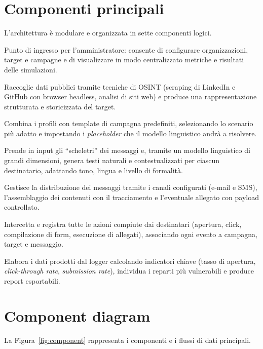 \documentclass[12pt,a4paper,oneside]{report}
\begin{document}
\section{Componenti principali}
L'architettura \`e modulare e organizzata in sette componenti logici.

\begin{description}[style=nextline,leftmargin=0pt]
  \item[Dashboard] Punto di ingresso per l'amministratore: consente di configurare
    organizzazioni, target e campagne e di visualizzare in modo centralizzato metriche e
    risultati delle simulazioni.
  \item[Target Information Collector] Raccoglie dati pubblici tramite tecniche di OSINT
    (scraping di LinkedIn e GitHub con browser headless, analisi di siti web) e produce una
    rappresentazione strutturata e storicizzata del target.
  \item[Phishing Campaign Generator] Combina i profili con template di campagna predefiniti,
    selezionando lo scenario pi\`u adatto e impostando i \emph{placeholder} che il modello
    linguistico andr\`a a risolvere.
  \item[NLP Text Personalizer] Prende in input gli ``scheletri'' dei messaggi e, tramite un
    modello linguistico di grandi dimensioni, genera testi naturali e contestualizzati per
    ciascun destinatario, adattando tono, lingua e livello di formalit\`a.
  \item[Campaign Launcher] Gestisce la distribuzione dei messaggi tramite i canali configurati
    (e-mail e SMS), l'assemblaggio dei contenuti con il tracciamento e l'eventuale
    allegato con payload controllato.
  \item[Interaction Logger] Intercetta e registra tutte le azioni compiute dai destinatari
    (apertura, click, compilazione di form, esecuzione di allegati),
    associando ogni evento a campagna, target e messaggio.
  \item[Risk Report Generator] Elabora i dati prodotti dal logger calcolando indicatori
    chiave (tasso di apertura, \emph{click-through rate}, \emph{submission rate}),
    individua i reparti pi\`u vulnerabili e produce report esportabili.
\end{description}

\section{Component diagram}
La Figura~\ref{fig:component} rappresenta i componenti e i flussi di dati principali.
\end{document}
